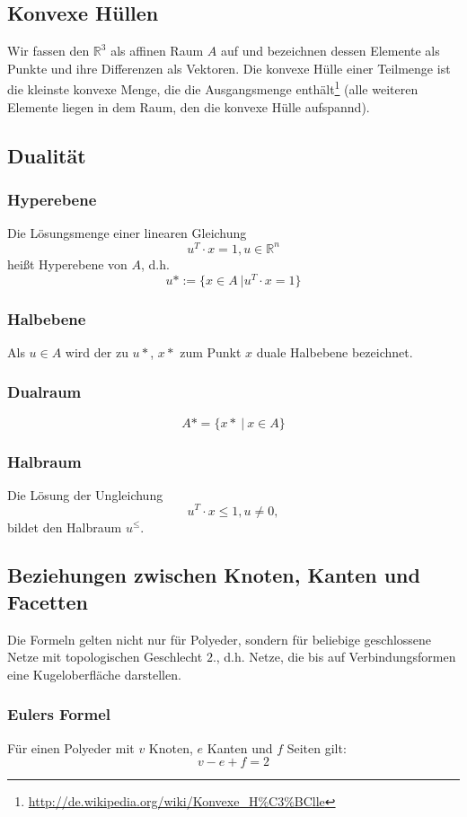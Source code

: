 \subsection{Konvexe Hüllen}
Wir fassen den \(\mathbb{R}^3\) als affinen Raum \(A\) auf und bezeichnen dessen Elemente als Punkte und ihre Differenzen als Vektoren. Die konvexe Hülle einer Teilmenge ist die kleinste konvexe Menge, die die Ausgangsmenge enthält\footnote{\url{http://de.wikipedia.org/wiki/Konvexe_H\%C3\%BClle}} (alle weiteren Elemente liegen in dem Raum, den die konvexe Hülle aufspannd).


\subsection{Dualität}

\subsubsection{Hyperebene}
Die Lösungsmenge einer linearen Gleichung
\[u^T \cdot x = 1, u \in \mathbb{R}^n\]
heißt Hyperebene von \(A\), d.h.
\[u* := \{x \in A~|u^T \cdot x = 1\}\]

\subsubsection{Halbebene}
Als \(u \in A\) wird der zu \(u*\), \(x*\) zum Punkt \(x\) duale Halbebene bezeichnet.

\subsubsection{Dualraum}
\[A* = \{x*~|~x \in A\}\]

\subsubsection{Halbraum}
Die Lösung der Ungleichung
\[u^T \cdot x \leq 1, u \ne 0,\]
bildet den Halbraum \(u^{\leq}\).


\subsection{Beziehungen zwischen Knoten, Kanten und Facetten}
Die Formeln gelten nicht nur für Polyeder, sondern für beliebige geschlossene Netze mit topologischen Geschlecht \(2\)., d.h. Netze, die bis auf Verbindungsformen eine Kugeloberfläche darstellen.

\subsubsection{Eulers Formel}
Für einen Polyeder mit \(v\) Knoten, \(e\) Kanten und \(f\) Seiten gilt:
\[v-e+f=2\]

